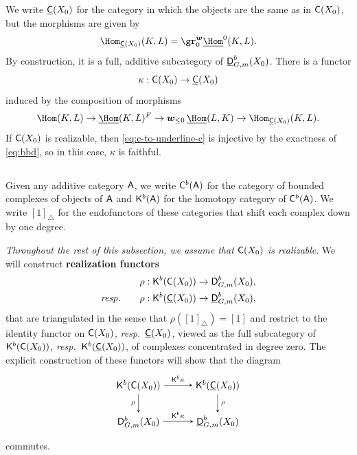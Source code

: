 \documentclass[a4paper,10pt,leqno]{amsart}
\theoremstyle{plain}
\theoremstyle{plain}
\theoremstyle{plain}
\theoremstyle{definition}
\theoremstyle{remark}
\newcommand{\dfemph}[1]{\textbf{#1}}
\begin{document}
We write $\underline{\sf{C}}(X_0)$ for the category in which the objects are the same as in $\sf{C}(X_0)$, but the morphisms are given by
\begin{align}
\Hom_{\underline{\sf{C}}(X_0)}(K, L) = \gr_0^{\bm{w}} \SHom^0(K, L).
\end{align}
By construction, it is a full, additive subcategory of $\underline{\sf{D}}_{G, m}^b(X_0)$.
There is a functor 
\begin{align}
\kappa : \sf{C}(X_0) \to \underline{\sf{C}}(X_0)
\end{align}
induced by the composition of morphisms 
\begin{align}\label{eq:c-to-underline-c}
\Hom(K, L) \to \SHom(K, L)^F \to \bm{w}_{\leq 0}\,\SHom(L, K) \to \Hom_{\underline{\sf{C}}(X_0)}(K, L).
\end{align}
If $\sf{C}(X_0)$ is realizable, then \eqref{eq:c-to-underline-c} is injective by the exactness of \eqref{eq:bbd}, so in this case, $\kappa$ is faithful.

\subsection{}

Given any additive category $\sf{A}$, we write $\sf{C}^b(\sf{A})$ for the category of bounded complexes of objects of $\sf{A}$ and $\sf{K}^b(\sf{A})$ for the homotopy category of $\sf{C}^b(\sf{A})$.
We write $[1]_\triangle$ for the endofunctors of these categories that shift each complex down by one degree.

\emph{Throughout the rest of this subsection, we assume that $\sf{C}(X_0)$ is realizable}.
We will construct \dfemph{realization functors}
\begin{align}
\rho : \sf{K}^b(\sf{C}(X_0)) &\to \sf{D}_{G, m}^b(X_0),\\
\emph{resp.}\qquad
\rho : \sf{K}^b(\underline{\sf{C}}(X_0)) &\to \underline{\sf{D}}_{G, m}^b(X_0),
\end{align}
that are triangulated in the sense that $\rho([1]_\triangle) = [1]$ and restrict to the identity functor on $\sf{C}(X_0)$, \emph{resp.}\ $\underline{\sf{C}}(X_0)$, viewed as the full subcategory of $\sf{K}^b(\sf{C}(X_0))$, \emph{resp.}\ $\sf{K}^b(\underline{\sf{C}}(X_0))$, of complexes concentrated in degree zero.
The explicit construction of these functors will show that the diagram
\begin{equation}\label{eq:kappa-rho}
\begin{tikzpicture}[baseline=(current bounding box.center), >=stealth]
\matrix(m)[matrix of math nodes, row sep=2em, column sep=3em, text height=2ex, text depth=0.5ex]
{	\sf{K}^b(\sf{C}(X_0))
		&\sf{K}^b(\underline{\sf{C}}(X_0))\\
	\sf{D}_{G, m}^b(X_0)
		&\underline{\sf{D}}_{G, m}^b(X_0)\\
		};
\path[->,font=\scriptsize, auto]
(m-1-1)		edge node{$\sf{K}^b\kappa$} (m-1-2)
(m-2-1)		edge node{$\sf{K}^b\kappa$} (m-2-2)
(m-1-1)		edge node[left]{$\rho$} (m-2-1)
(m-1-2)		edge node{$\rho$} (m-2-2);
\end{tikzpicture}
\end{equation}
commutes.
\end{document}
